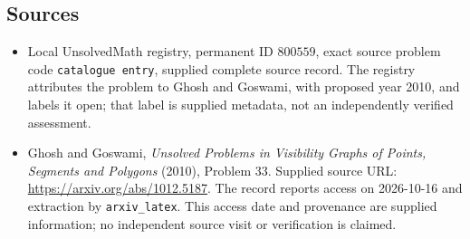 \documentclass[11pt]{article}
\begin{document}
\subsection{Sources}
\begin{itemize}
\item Local UnsolvedMath registry, permanent ID $800559$, exact source problem code \texttt{catalogue entry}, supplied complete source record. The registry attributes the problem to Ghosh and Goswami, with proposed year 2010, and labels it open; that label is supplied metadata, not an independently verified assessment.
\item Ghosh and Goswami, \emph{Unsolved Problems in Visibility Graphs of Points, Segments and Polygons} (2010), Problem 33. Supplied source URL: \url{https://arxiv.org/abs/1012.5187}. The record reports access on 2026-10-16 and extraction by \texttt{arxiv\_latex}. This access date and provenance are supplied information; no independent source visit or verification is claimed.
\end{itemize}
\end{document}
